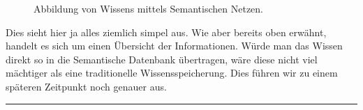 \begin{figure}[H]
\centering {}
\caption{Abbildung von Wissens mittels Semantischen Netzen.\label{fig:semantischesNetz}\protect\footnotemark}
\end{figure}

Dies sieht hier ja alles ziemlich simpel aus. Wie aber bereits oben erwähnt, handelt es sich um einen Übersicht der Informationen. Würde man das Wissen direkt so in die Semantische Datenbank übertragen, wäre diese nicht viel mächtiger als eine traditionelle Wissensspeicherung. Dies führen wir zu einem späteren Zeitpunkt noch genauer aus.\\

\vspace{0.1pt}
\noindent\rule[1ex]{\textwidth}{1pt}


